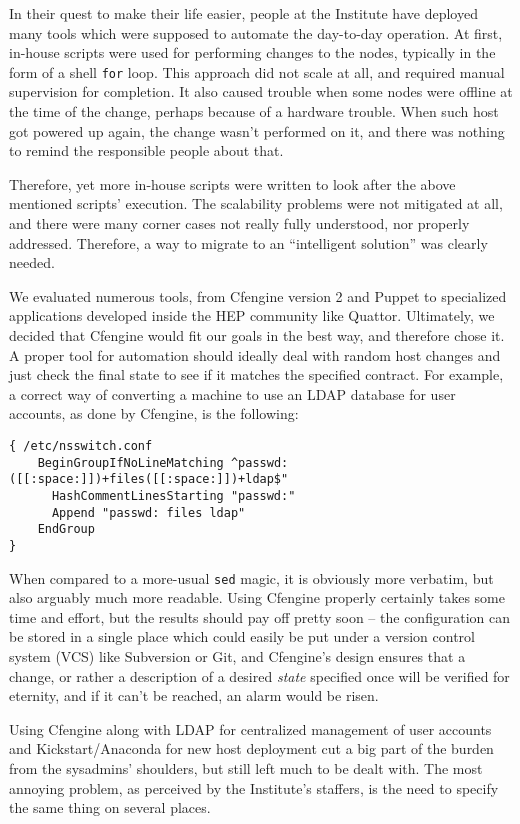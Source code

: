 \documentclass[11pt]{article}
\begin{document}
In their quest to make their life easier, people at the Institute have deployed
many tools which were supposed to automate the day-to-day operation.  At first,
in-house scripts were used for performing changes to the nodes, typically in the
form of a shell {\tt for} loop.  This approach did not scale at all, and
required manual supervision for completion.  It also caused trouble when some
nodes were offline at the time of the change, perhaps because of a hardware
trouble.  When such host got powered up again, the change wasn't performed on
it, and there was nothing to remind the responsible people about that.

Therefore, yet more in-house scripts were written to look after the above
mentioned scripts' execution.  The scalability problems were not mitigated at
all, and there were many corner cases not really fully understood, nor properly
addressed.  Therefore, a way to migrate to an ``intelligent solution'' was
clearly needed.

We evaluated numerous tools, from Cfengine version 2 and Puppet to specialized
applications developed inside the HEP community like Quattor.  Ultimately, we
decided that Cfengine would fit our goals in the best way, and therefore chose
it.  A proper tool for automation should ideally deal with random host changes
and just check the final state to see if it matches the specified contract.  For
example, a correct way of converting a machine to use an LDAP database for user
accounts, as done by Cfengine, is the following:

{\scriptsize
\begin{verbatim}
{ /etc/nsswitch.conf
    BeginGroupIfNoLineMatching ^passwd:([[:space:]])+files([[:space:]])+ldap$"
      HashCommentLinesStarting "passwd:"
      Append "passwd: files ldap"
    EndGroup
}
\end{verbatim}
}

When compared to a more-usual {\tt sed} magic, it is obviously more verbatim,
but also arguably much more readable.  Using Cfengine properly certainly takes
some time and effort, but the results should pay off pretty soon -- the
configuration can be stored in a single place which could easily be put under a
version control system (VCS) like Subversion or Git, and Cfengine's design
ensures that a change, or rather a description of a desired {\em state}
specified once will be verified for eternity, and if it can't be reached, an
alarm would be risen.

Using Cfengine along with LDAP for centralized management of user accounts and
Kickstart/Anaconda for new host deployment cut a big part of the burden from the
sysadmins' shoulders, but still left much to be dealt with.  The most annoying
problem, as perceived by the Institute's staffers, is the need to specify the
same thing on several places.
\end{document}
